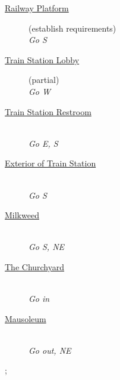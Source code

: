 \documentclass[a5paper]{extarticle}
\begin{document}
\begin{description}
\item[{\hyperref[sec:req-Railway-Platform-0]{Railway Platform}}] (establish requirements)\\
  \emph{Go S}
\item[{\hyperref[sec:req-Train-Station-Lobby-0]{Train Station Lobby}}] (partial)\\
  \emph{Go W}
\item[{\hyperref[sec:req-Train-Station-Restroom]{Train Station Restroom}}] ~\\
  \emph{Go E, S}
\item[{\hyperref[sec:req-Exterior-of-Train-Station]{Exterior of Train Station}}] ~\\
  \emph{Go S}
\item[{\hyperref[sec:req-Milkweed]{Milkweed}}] ~\\
  \emph{Go S, NE}
\item[{\hyperref[sec:req-Churchyard]{The Churchyard}}] ~\\
  \emph{Go in}
\item[{\hyperref[sec:req-Mausoleum]{Mausoleum}}] ~\\
  \emph{Go out, NE}
\end{description}

\begin{adjustbox}{center}
\sffamily\footnotesize
\begin{gamemap}[set grid={10em}{5em}]
;
\end{gamemap}
\end{adjustbox}
\end{document}
